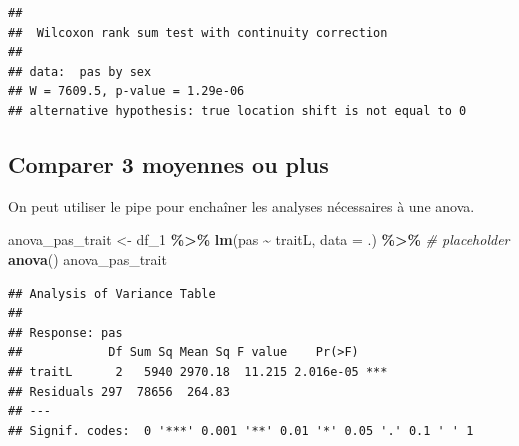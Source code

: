 \documentclass[
]{book}
\newenvironment{Shaded}{\begin{snugshade}}{\end{snugshade}}
\newcommand{\AttributeTok}[1]{\textcolor[rgb]{0.13,0.29,0.53}{#1}}
\newcommand{\CommentTok}[1]{\textcolor[rgb]{0.56,0.35,0.01}{\textit{#1}}}
\newcommand{\DocumentationTok}[1]{\textcolor[rgb]{0.56,0.35,0.01}{\textbf{\textit{#1}}}}
\newcommand{\FunctionTok}[1]{\textcolor[rgb]{0.13,0.29,0.53}{\textbf{#1}}}
\newcommand{\NormalTok}[1]{#1}
\newcommand{\OtherTok}[1]{\textcolor[rgb]{0.56,0.35,0.01}{#1}}
\newcommand{\SpecialCharTok}[1]{\textcolor[rgb]{0.81,0.36,0.00}{\textbf{#1}}}
\begin{document}
\begin{verbatim}
## 
##  Wilcoxon rank sum test with continuity correction
## 
## data:  pas by sex
## W = 7609.5, p-value = 1.29e-06
## alternative hypothesis: true location shift is not equal to 0
\end{verbatim}

\subsection{Comparer 3 moyennes ou plus}\label{comparer-3-moyennes-ou-plus-2}

On peut utiliser le pipe pour enchaîner les analyses nécessaires à une anova.

\begin{Shaded}
\begin{Highlighting}[]
\NormalTok{anova\_pas\_trait }\OtherTok{\textless{}{-}}\NormalTok{ df\_1 }\SpecialCharTok{\%\textgreater{}\%}
  \FunctionTok{lm}\NormalTok{(pas }\SpecialCharTok{\textasciitilde{}}\NormalTok{ traitL, }
     \AttributeTok{data =}\NormalTok{ .) }\SpecialCharTok{\%\textgreater{}\%} \CommentTok{\# placeholder}
  \FunctionTok{anova}\NormalTok{()}
\NormalTok{anova\_pas\_trait}
\end{Highlighting}
\end{Shaded}

\begin{verbatim}
## Analysis of Variance Table
## 
## Response: pas
##            Df Sum Sq Mean Sq F value    Pr(>F)    
## traitL      2   5940 2970.18  11.215 2.016e-05 ***
## Residuals 297  78656  264.83                      
## ---
## Signif. codes:  0 '***' 0.001 '**' 0.01 '*' 0.05 '.' 0.1 ' ' 1
\end{verbatim}

\begin{Shaded}
\end{Shaded}
\end{document}
